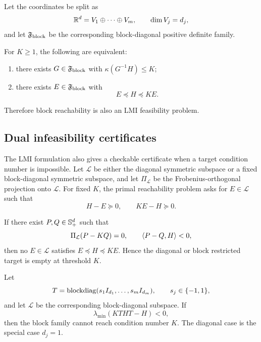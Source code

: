 Let the coordinates be split as
\[
  \mathbb R^d=V_1\oplus\cdots\oplus V_m,
\qquad \dim V_j=d_j,
\]
and let \(\mathfrak F_{\mathrm{block}}\) be the corresponding block-diagonal positive
definite family.

\begin{theorem}
\label{thm:block-lmi}
For \(K\ge1\), the following are equivalent:
\begin{enumerate}[leftmargin=*,itemsep=0.1em]
  \item there exists \(G\in\mathfrak F_{\mathrm{block}}\) with
  \(\kappa(G^{-1}H)\le K\);
  \item there exists \(E\in\mathfrak F_{\mathrm{block}}\) with
  \[
    E\preceq H\preceq K E.
  \]
\end{enumerate}
Therefore block reachability is also an LMI feasibility problem.
\end{theorem}

\subsection{Dual infeasibility certificates}

The LMI formulation also gives a checkable certificate when a target condition
number is impossible. Let \(\mathcal L\) be either the diagonal symmetric
subspace or a fixed block-diagonal symmetric subspace, and let
\(\Pi_{\mathcal L}\) be the Frobenius-orthogonal projection onto
\(\mathcal L\). For fixed \(K\), the primal reachability problem asks for
\(E\in\mathcal L\) such that
\[
  H-E\succeq0,\qquad KE-H\succeq0.
\]

\begin{proposition}
\label{prop:structured-dual-certificate}
If there exist \(P,Q\in\mathbb S_{+}^d\) such that
\[
  \Pi_{\mathcal L}(P-KQ)=0,
  \qquad
  \left\langle P-Q,H\right\rangle<0,
\]
then no \(E\in\mathcal L\) satisfies \(E\preceq H\preceq KE\). Hence the
diagonal or block restricted target is empty at threshold \(K\).
\end{proposition}

\begin{corollary}
\label{cor:sign-flip-certificate}
Let
\[
  T=\operatorname{blockdiag}(s_1 I_{d_1},\ldots,s_m I_{d_m}),
  \qquad s_j\in\{-1,1\},
\]
and let \(\mathcal L\) be the corresponding block-diagonal subspace. If
\[
  \lambda_{\min}(K THT-H)<0,
\]
then the block family cannot reach condition number \(K\). The diagonal case is
the special case \(d_j=1\).
\end{corollary}

